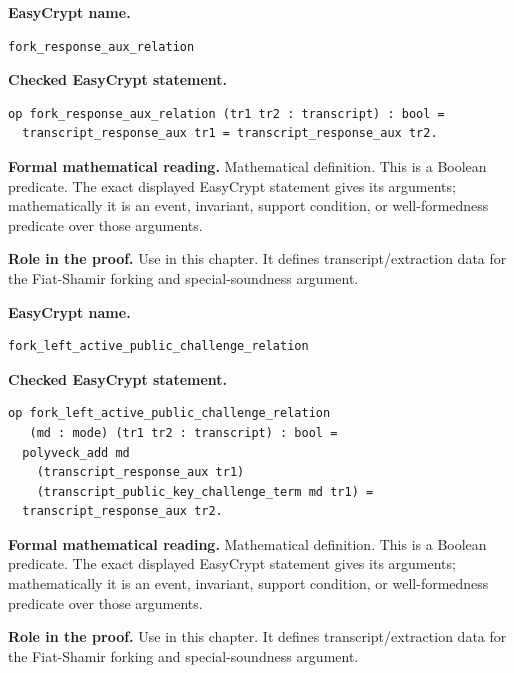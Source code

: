 \begin{formaldefinition}
\noindent\textbf{EasyCrypt name.}
\begin{lstlisting}[language=EasyCrypt,basicstyle=\ttfamily\scriptsize]
fork_response_aux_relation
\end{lstlisting}
\noindent\textbf{Checked EasyCrypt statement.}
\begin{lstlisting}[language=EasyCrypt,basicstyle=\ttfamily\scriptsize]
op fork_response_aux_relation (tr1 tr2 : transcript) : bool =
  transcript_response_aux tr1 = transcript_response_aux tr2.
\end{lstlisting}
\noindent\textbf{Formal mathematical reading.}
Mathematical definition. This is a Boolean predicate.  The exact displayed EasyCrypt statement gives its arguments; mathematically it is an event, invariant, support condition, or well-formedness predicate over those arguments.

\noindent\textbf{Role in the proof.}
Use in this chapter. It defines transcript/extraction data for the Fiat-Shamir forking and special-soundness argument.

\end{formaldefinition}

\begin{formaldefinition}
\noindent\textbf{EasyCrypt name.}
\begin{lstlisting}[language=EasyCrypt,basicstyle=\ttfamily\scriptsize]
fork_left_active_public_challenge_relation
\end{lstlisting}
\noindent\textbf{Checked EasyCrypt statement.}
\begin{lstlisting}[language=EasyCrypt,basicstyle=\ttfamily\scriptsize]
op fork_left_active_public_challenge_relation
   (md : mode) (tr1 tr2 : transcript) : bool =
  polyveck_add md
    (transcript_response_aux tr1)
    (transcript_public_key_challenge_term md tr1) =
  transcript_response_aux tr2.
\end{lstlisting}
\noindent\textbf{Formal mathematical reading.}
Mathematical definition. This is a Boolean predicate.  The exact displayed EasyCrypt statement gives its arguments; mathematically it is an event, invariant, support condition, or well-formedness predicate over those arguments.

\noindent\textbf{Role in the proof.}
Use in this chapter. It defines transcript/extraction data for the Fiat-Shamir forking and special-soundness argument.

\end{formaldefinition}

